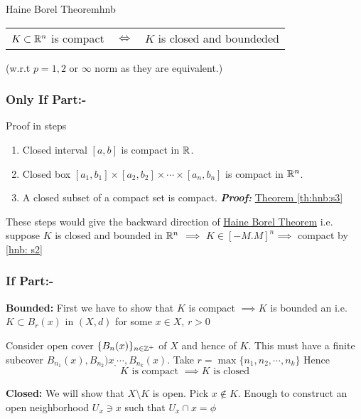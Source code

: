\begin{Theorem}{Haine Borel Theorem}{hnb}
	\begin{center}
		\begin{tabular}{rcl}
			$K\subset \mathbb{R}^n$ is compact & $\iff$ & $K$ is closed and boundeded
		\end{tabular}
	\end{center}
	(w.r.t $p=1,2$ or $\infty$ norm as they are equivalent.)
\end{Theorem}
\begin{myproof}
	\subsubsection{Only If Part:-}
	Proof in steps
	\begin{enumerate}[label=\bfseries\tiny\protect\circled{\small\arabic*}]
		\item \label{hnb: s1}Closed interval $[a,b]$ is compact in $\mathbb{R}$. %
		\item \label{hnb: s2}Closed box $[a_1,b_1]\times [a_2,b_2]\times\cdots\times
		[a_n,b_n]$ is compact in $\mathbb{R}^n$. %
		\item \label{hnb: s3}A closed subset of a compact set is compact. \textbf{\textit{Proof:}} \hyperref[th:hnb:s3]{Theorem \ref{th:hnb:s3}}
	\end{enumerate}
	These steps would give the backward direction of \hyperref[th:hnb]{Haine Borel
		Theorem} i.e. suppose $K$ is closed and bounded in $\mathbb{R}^n$ $\implies$ $K\in
	[-M.M]^n\implies $ compact by \ref{hnb: s2}
	
	\subsubsection{If Part:-}
	\textbf{Bounded:} First we have to show that $K$ is compact $\implies K$ is
	bounded an i.e. $K\subset B_r(x)$ in $(X,d)$ for some $x\in X$, $r>0$
	
	Consider open cover $\{B_n(x)\}_{n\in\mathbb{Z}^+}$ of $X$ and hence of $K$. This must
	have a finite subcover $B_{n_1}(x),B_{n_2})x_,\cdots , B_{n_k}(x)$. Take
	$r=\max\{n_1,n_2,\cdots,n_k\}$ Hence $$K\text{ is compact }\implies K\text{ is
		closed}$$
	
	\parinf\textbf{Closed: }\parinn We will show that $X\setminus K$ is open. Pick 
	$x\notin K$. Enough to construct an open neighborhood $U_x\ni x$ such that
	$U_x\cap x=\phi$
	

\end{myproof}
